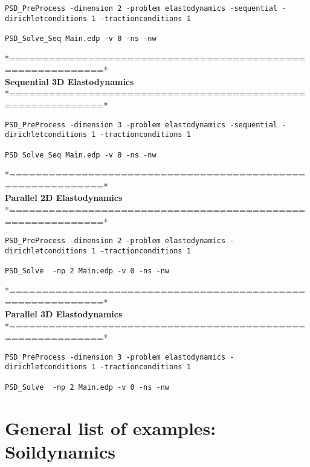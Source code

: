 \begin{lstlisting}[style=BashInputStyle]
PSD_PreProcess -dimension 2 -problem elastodynamics -sequential -dirichletconditions 1 -tractionconditions 1 

PSD_Solve_Seq Main.edp -v 0 -ns -nw
\end{lstlisting}
*============================================================*\\
\textbf{ Sequential 3D Elastodynamics}  \\                    
*============================================================*\\

\begin{lstlisting}[style=BashInputStyle]
PSD_PreProcess -dimension 3 -problem elastodynamics -sequential -dirichletconditions 1 -tractionconditions 1 

PSD_Solve_Seq Main.edp -v 0 -ns -nw
\end{lstlisting}
*============================================================*\\
\textbf{ Parallel 2D Elastodynamics}   \\                   
*============================================================*\\

\begin{lstlisting}[style=BashInputStyle]
PSD_PreProcess -dimension 2 -problem elastodynamics -dirichletconditions 1 -tractionconditions 1 

PSD_Solve  -np 2 Main.edp -v 0 -ns -nw
\end{lstlisting}
*============================================================*\\
\textbf{ Parallel 3D Elastodynamics } \\                    
*============================================================*\\

\begin{lstlisting}[style=BashInputStyle]
PSD_PreProcess -dimension 3 -problem elastodynamics -dirichletconditions 1 -tractionconditions 1 

PSD_Solve  -np 2 Main.edp -v 0 -ns -nw
\end{lstlisting}

\section{General list of examples: Soildynamics} 

